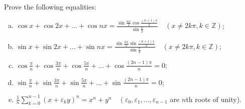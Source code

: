 \begin{problem}
Prove the following equalities:
\begin{enumerate}[a) ]
\item $\cos x+\cos 2 x+\ldots+\cos n x=\frac{\sin \frac{n x}{2} \cos \frac{(n+1) x}{2}}{\sin \frac{x}{2}} \quad(x \neq 2 k \pi, k \in \mathbb{Z})$;

\item $\sin x+\sin 2 x+\ldots+\sin n x=\frac{\sin \frac{n x}{2} \sin \frac{(n+1) x}{2}}{\sin \frac{x}{2}} \quad(x \neq 2 k \pi, k \in \mathbb{Z})$;

\item $\cos \frac{\pi}{n}+\cos \frac{3 \pi}{n}+\cos \frac{5 \pi}{n}+\ldots+\cos \frac{(2 n-1) \pi}{n}=0$;

\item $\sin \frac{\pi}{n}+\sin \frac{3 \pi}{n}+\sin \frac{5 \pi}{n}+\ldots+\sin \frac{(2 n-1) \pi}{n}=0$;

\item $\frac{1}{n} \sum_{k=0}^{n-1}\left(x+\varepsilon_k y\right)^n=x^n+y^n \quad\left(\varepsilon_0, \varepsilon_1, \ldots, \varepsilon_{n-1}\right.$ are $n$th roots of unity).
    \end{enumerate}
\end{problem}
